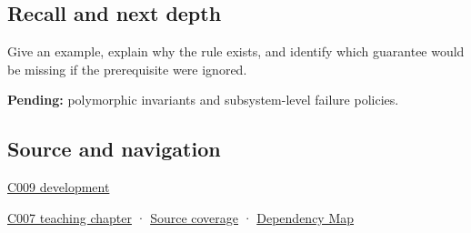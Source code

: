 \subsection{Recall and next depth}\label{appendix-8e5214819615-recall-and-next-depth}

Give an example, explain why the rule exists, and identify which guarantee would be missing if the prerequisite were ignored.

\textbf{Pending:} polymorphic invariants and subsystem-level failure policies.

\subsection{Source and navigation}\label{appendix-8e5214819615-source-and-navigation}

\hyperref[appendix-fd090d982a15-m009---parts-127-147]{C009 development}

\hyperref[01-foundations-i-ch003-public-records-and-protected-invariants]{C007 teaching chapter} · \hyperref[appendix-fd090d982a15-m007---parts-101-112]{Source coverage} · \hyperref[appendix-4ad47bdd269a]{Dependency Map}

